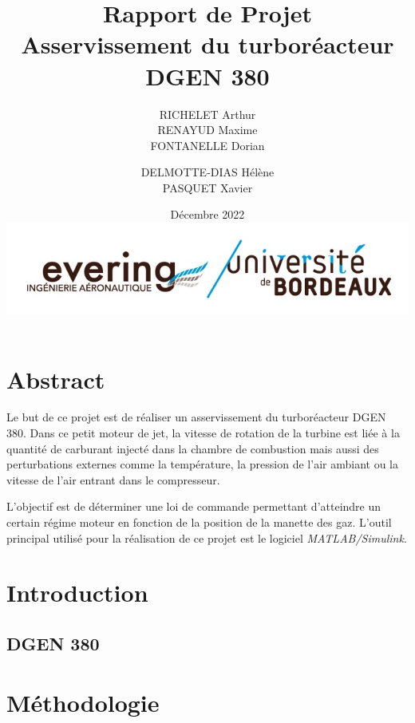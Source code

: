 \documentclass[12pt]{report}
\title{{\Huge Rapport de Projet} \\Asservissement du turboréacteur DGEN 380 }
\author{RICHELET Arthur
\\RENAYUD Maxime
\\FONTANELLE Dorian
\and
  DELMOTTE-DIAS Hélène
\\PASQUET Xavier}
\date{ 
Décembre 2022 \\
\vspace{2cm}
\includegraphics[scale=0.4]{fig/evering_logo.jpg}}
\begin{document}
\maketitle

\tableofcontents


\newpage

\chapter{Abstract}

Le but de ce projet est de réaliser un asservissement
du turboréacteur DGEN 380.
Dans ce petit moteur de jet, la vitesse de rotation de la turbine 
est liée à la quantité de carburant injecté dans la chambre de 
combustion mais aussi des perturbations externes comme la température,
la pression de l'air ambiant ou la vitesse de l'air entrant dans le compresseur.\newline
 
L'objectif est de déterminer une loi de commande permettant d'atteindre un certain
régime moteur en fonction de la position de la manette des gaz. L'outil principal
utilisé pour la réalisation de ce projet est le logiciel {\it MATLAB/Simulink}.


\chapter{Introduction}
\section{DGEN 380} %
\lipsum[1-2]

\section{}

\chapter{Méthodologie}
\end{document}
